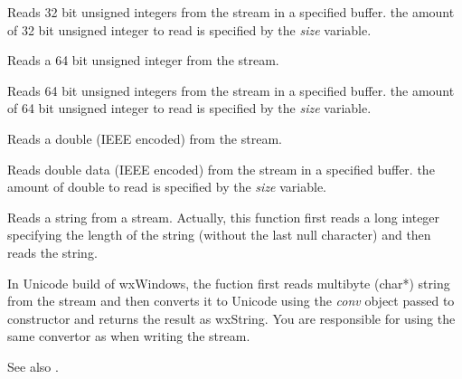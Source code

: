 Reads 32 bit unsigned integers from the stream in a specified buffer. the amount of
32 bit unsigned integer to read is specified by the {\it size} variable.



Reads a 64 bit unsigned integer from the stream.


Reads 64 bit unsigned integers from the stream in a specified buffer. the amount of
64 bit unsigned integer to read is specified by the {\it size} variable.



Reads a double (IEEE encoded) from the stream.


Reads double data (IEEE encoded) from the stream in a specified buffer. the amount of
double to read is specified by the {\it size} variable.

\label{wxdatainputstreamreadstring}


Reads a string from a stream. Actually, this function first reads a long 
integer specifying the length of the string (without the last null character) 
and then reads the string.

In Unicode build of wxWindows, the fuction first reads multibyte (char*)
string from the stream and then converts it to Unicode using the {\it conv}
object passed to constructor and returns the result as wxString. You are
responsible for using the same convertor as when writing the stream.

See also .
